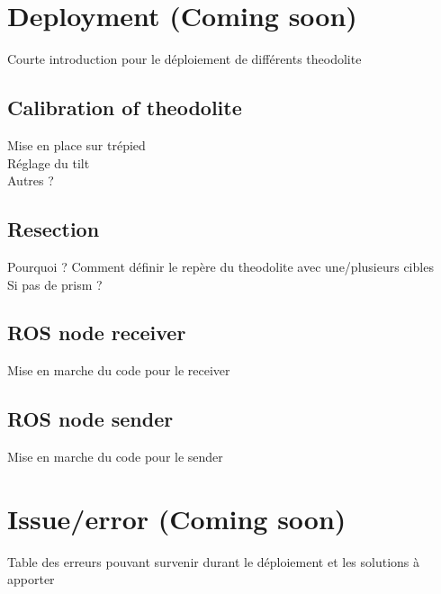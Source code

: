 \documentclass[10pt,letterpaper,oneside]{article}
\begin{document}

\section{Deployment (Coming soon)}
\label{sec:Deployment}

Courte introduction pour le déploiement de différents theodolite

\subsection{Calibration of theodolite}

Mise en place sur trépied \\
Réglage du tilt \\
Autres ? \\

\subsection{Resection}

Pourquoi ?
Comment définir le repère du theodolite avec une/plusieurs cibles \\
Si pas de prism ? \\

\subsection{ROS node receiver}

Mise en marche du code pour le receiver

\subsection{ROS node sender}

Mise en marche du code pour le sender

\section{Issue/error (Coming soon)}
\label{sec:issue}

Table des erreurs pouvant survenir durant le déploiement et les solutions à apporter

\printbibliography
\end{document}
